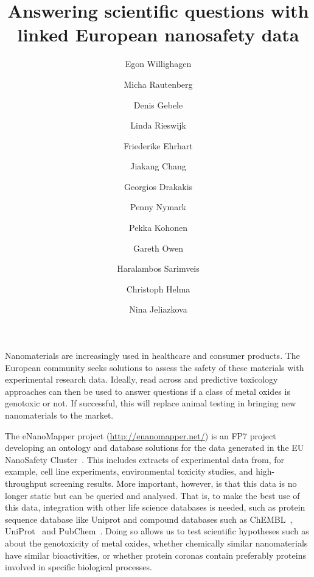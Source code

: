 \documentclass{llncs}
\begin{document}
\title{Answering scientific questions with linked European nanosafety data}

\author{
  Egon Willighagen \and
  Micha Rautenberg \and
  Denis Gebele \and
  Linda Rieswijk \and
  Friederike Ehrhart \and
  Jiakang Chang \and
  Georgios Drakakis \and
  Penny Nymark \and
  Pekka Kohonen \and
  Gareth Owen \and
  Haralambos Sarimveis \and
  Christoph Helma \and
  Nina Jeliazkova
}


\maketitle

Nanomaterials are increasingly used in healthcare and consumer products. The 
European community seeks solutions to assess the safety of these materials
with experimental research data. Ideally, read across and 
predictive toxicology approaches can then be used to answer questions if a class 
of metal oxides is genotoxic or not. If successful, this will replace animal 
testing in bringing new nanomaterials to the market.

The eNanoMapper project (\url{http://enanomapper.net/}) is an FP7 project developing
an ontology and database  solutions for the data generated in the EU NanoSafety
Cluster~\cite{Hastings2015,Jeliazkova2015}. This
includes extracts of experimental data from, for example, cell line experiments, 
environmental toxicity studies, and high-throughput screening results. More 
important, however, is that this data is no longer static but can be queried and 
analysed. That is, to make the best use of this data, integration with other 
life science databases is needed, such as protein sequence database like Uniprot 
and compound databases such as ChEMBL~\cite{Willighagen2013}, 
UniProt~\cite{UniProt2014} and PubChem~\cite{Fu2015}. Doing so allows us to 
test scientific hypotheses such as about the genotoxicity of metal oxides, 
whether chemically similar nanomaterials have similar bioactivities, or whether 
protein coronas contain preferably proteins involved in specific biological 
processes.
\end{document}
